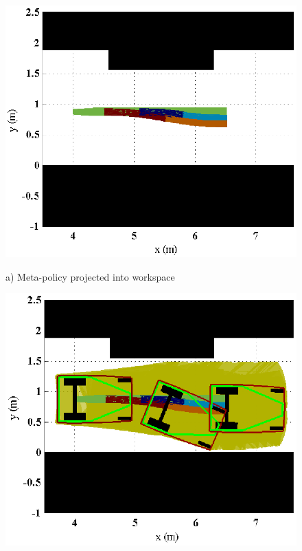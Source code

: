 \begin{figure}[bt]
 \begin{center}
 \begin{minipage}[b]{\linewidth}
 \begin{minipage}[b]{0.45\linewidth}
  \centering 
  \includegraphics[width=\linewidth]{graphics/lagr_meta.eps}

  {\scriptsize a) Meta-policy projected into workspace}

 \end{minipage}
 \hspace{0.03\linewidth} %
 \begin{minipage}[b]{0.45\linewidth}
   \centering 
   \includegraphics[width=\linewidth]{graphics/lagr_meta_padded.eps}


\end{minipage}
\end{minipage}
\end{center}
\end{figure}
